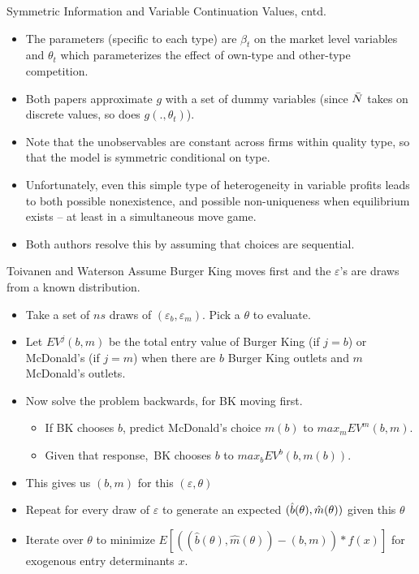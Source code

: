 \documentclass[xcolor=pdftex,dvipsnames,table,mathserif]{beamer}
\begin{document}
\begin{frame}{Symmetric Information and Variable Continuation Values,
cntd.}
\begin{itemize}
\item The parameters (specific to each type) are $\beta _{t}$ on the market
level variables and $\theta _{t}$ which parameterizes the effect of own-type
and other-type competition.
\item Both papers approximate $g$ with a set of dummy variables (since $\bar{%
N}$ takes on discrete values, so does $g(.,\theta _{t})$).
\item Note that the unobservables are constant across firms within quality
type, so that the model is symmetric conditional on type.
\item Unfortunately, even this simple type of heterogeneity in variable
profits leads to both possible nonexistence, and possible non-uniqueness
when equilibrium exists -- at least in a simultaneous move game.
\item Both authors resolve this by assuming that choices are sequential.
\end{itemize}
\end{frame}


\begin{frame}{Toivanen and Waterson}
Assume Burger King moves first and the $\varepsilon $'s are draws from a
known distribution.
\begin{itemize}
\item Take a set of $ns$ draws of $(\varepsilon _{b},\varepsilon _{m})$.
Pick a $\theta $ to evaluate.
\item Let $EV^{j}(b,m)$ be the total entry value of Burger King (if $j=b$)
or McDonald's (if $j=m$) when there are $b$ Burger King outlets and $m$
McDonald's outlets.
\item Now solve the problem backwards, for BK moving first.
\begin{itemize}
\item If BK chooses $b$, predict McDonald's choice $m(b)$ to $%
max_{m}EV^{m}(b,m)$.
\item Given that response,\ BK chooses $b$ to $max_{b}EV^{b}(b,m(b))$.
\end{itemize}
\item This gives us $(b,m)$ for this $(\varepsilon ,\theta )$
\item Repeat for every draw of $\varepsilon $ to generate an expected $(\hat{%
b}(\theta ),\hat{m}(\theta ))$ given this $\theta $
\item Iterate over $\theta $ to minimize $E[((\hat{b}(\theta ),\hat{m}%
(\theta ))-(b,m))\ast f(x)]$ for exogenous entry determinants $x$.
\end{itemize}
\end{frame}
\end{document}
